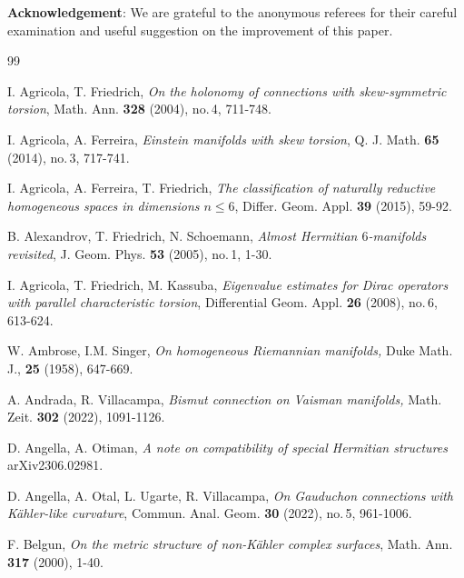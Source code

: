\documentclass{amsart}
\numberwithin{equation}{section}
\theoremstyle{definition}
\renewcommand{\1}{\mathds{1}}
\renewcommand{\>}{\rightarrow}
\begin{document}
%
%



\vspace{1cm}

\textbf{Acknowledgement}: We are grateful to the anonymous referees for their careful examination
and useful suggestion on the improvement of this paper.

\begin{thebibliography}{99}

 I. Agricola, T. Friedrich,
\newblock \textit{On the holonomy of connections with skew-symmetric torsion},
\newblock Math. Ann. \textbf{328} (2004), no.\,4, 711-748.

 I. Agricola, A. Ferreira,
\newblock \textit{Einstein manifolds with skew torsion},
\newblock Q. J. Math. {\bf 65} (2014), no.\,3, 717-741.

 I. Agricola, A. Ferreira, T. Friedrich,
\newblock \textit{The classification of naturally reductive homogeneous spaces in dimensions $n\leq6$},
\newblock Differ. Geom. Appl. {\bf 39} (2015), 59-92.

 B. Alexandrov, T. Friedrich, N. Schoemann,
\newblock \textit{Almost Hermitian $6$-manifolds revisited},
\newblock J. Geom. Phys. {\bf 53} (2005), no.\,1, 1-30.

 I. Agricola, T. Friedrich, M. Kassuba,
\newblock \textit{Eigenvalue estimates for Dirac operators with parallel characteristic torsion},
\newblock Differential Geom. Appl. \textbf{26} (2008), no.\,6, 613-624.

 W. Ambrose, I.M. Singer,
\newblock \textit{On homogeneous Riemannian manifolds,}
\newblock Duke Math. J., {\bf 25} (1958), 647-669.

 A. Andrada, R. Villacampa,
\newblock \textit{Bismut connection on Vaisman manifolds,}
\newblock Math. Zeit. \textbf{302} (2022), 1091-1126.

 D. Angella, A. Otiman,
\newblock \textit{A note on compatibility of special Hermitian structures}
\newblock arXiv2306.02981.

 D. Angella, A. Otal, L. Ugarte, R. Villacampa,
\newblock \textit{On Gauduchon connections with K\"ahler-like curvature},
\newblock Commun. Anal. Geom. \textbf{30} (2022), no.\,5, 961-1006.


 F. Belgun,
\newblock \textit{On the metric structure of non-K\"ahler complex surfaces},
\newblock Math. Ann. \textbf{317} (2000), 1-40.


\end{thebibliography}
\end{document}
